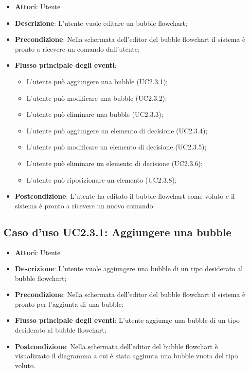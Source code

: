 \documentclass[../AnalisiDeiRequisiti.tex]{subfiles}
\begin{document}
					\begin{itemize}
						\item \textbf{Attori}: Utente
						\item \textbf{Descrizione}: L'utente vuole editare un bubble flowchart;
						\item \textbf{Precondizione}: Nella schermata dell'editor del bubble flowchart il sistema è pronto a ricevere un comando dall'utente;
						\item \textbf{Flusso principale degli eventi}: \begin{itemize}
							\item L'utente può aggiungere una bubble (UC2.3.1);
							\item L'utente può modificare una bubble (UC2.3.2);
							\item L'utente può eliminare una bubble (UC2.3.3);
							\item L'utente può aggiungere un elemento di decisione (UC2.3.4);
							\item L'utente può modificare un elemento di decisione (UC2.3.5);
							\item L'utente può eliminare un elemento di decisione (UC2.3.6);
							\item L'utente può riposizionare un elemento (UC2.3.8);
						\end{itemize}
						\item \textbf{Postcondizione}: L'utente ha editato il bubble flowchart come voluto e il sistema è pronto a ricevere un nuovo comando.
					\end{itemize}
					\subsection{Caso d'uso UC2.3.1: Aggiungere una bubble}
					\begin{itemize}
						\item \textbf{Attori}: Utente
						\item \textbf{Descrizione}: L'utente vuole aggiungere una bubble di un tipo desiderato al bubble flowchart;
						\item \textbf{Precondizione}: Nella schermata dell'editor del bubble flowchart il sistema è pronto per l'aggiunta di una bubble;
						\item \textbf{Flusso principale degli eventi}: L'utente aggiunge una bubble di un tipo desiderato al bubble flowchart;
						\item \textbf{Postcondizione}: Nella schermata dell'editor del bubble flowchart è visualizzato il diagramma a cui è stata aggiunta una bubble vuota del tipo voluto.
					\end{itemize}
\end{document}
